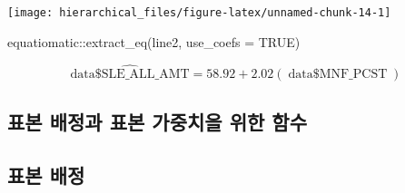 \documentclass[
]{book}
\newenvironment{Shaded}{\begin{snugshade}}{\end{snugshade}}
\newcommand{\AttributeTok}[1]{\textcolor[rgb]{0.77,0.63,0.00}{#1}}
\newcommand{\CommentTok}[1]{\textcolor[rgb]{0.56,0.35,0.01}{\textit{#1}}}
\newcommand{\ConstantTok}[1]{\textcolor[rgb]{0.00,0.00,0.00}{#1}}
\newcommand{\ControlFlowTok}[1]{\textcolor[rgb]{0.13,0.29,0.53}{\textbf{#1}}}
\newcommand{\FunctionTok}[1]{\textcolor[rgb]{0.00,0.00,0.00}{#1}}
\newcommand{\NormalTok}[1]{#1}
\newcommand{\OtherTok}[1]{\textcolor[rgb]{0.56,0.35,0.01}{#1}}
\newcommand{\SpecialCharTok}[1]{\textcolor[rgb]{0.00,0.00,0.00}{#1}}
\begin{document}
\texttt{[image: hierarchical\_files/figure-latex/unnamed-chunk-14-1]}

\begin{Shaded}
\begin{Highlighting}[]
\NormalTok{equatiomatic}\SpecialCharTok{::}\FunctionTok{extract\_eq}\NormalTok{(line2, }\AttributeTok{use\_coefs =} \ConstantTok{TRUE}\NormalTok{)}
\end{Highlighting}
\end{Shaded}

\[
\operatorname{\widehat{data\$SLE\_ALL\_AMT}} = 58.92 + 2.02(\operatorname{data\$MNF\_PCST})
\]

\hypertarget{uxd45cuxbcf8-uxbc30uxc815uxacfc-uxd45cuxbcf8-uxac00uxc911uxce58uxc744-uxc704uxd55c-uxd568uxc218}{%
\subsection{표본 배정과 표본 가중치을 위한 함수}\label{uxd45cuxbcf8-uxbc30uxc815uxacfc-uxd45cuxbcf8-uxac00uxc911uxce58uxc744-uxc704uxd55c-uxd568uxc218}}

\begin{Shaded}
\end{Shaded}

\hypertarget{uxd45cuxbcf8-uxbc30uxc815}{%
\subsection{표본 배정}\label{uxd45cuxbcf8-uxbc30uxc815}}
\end{document}
